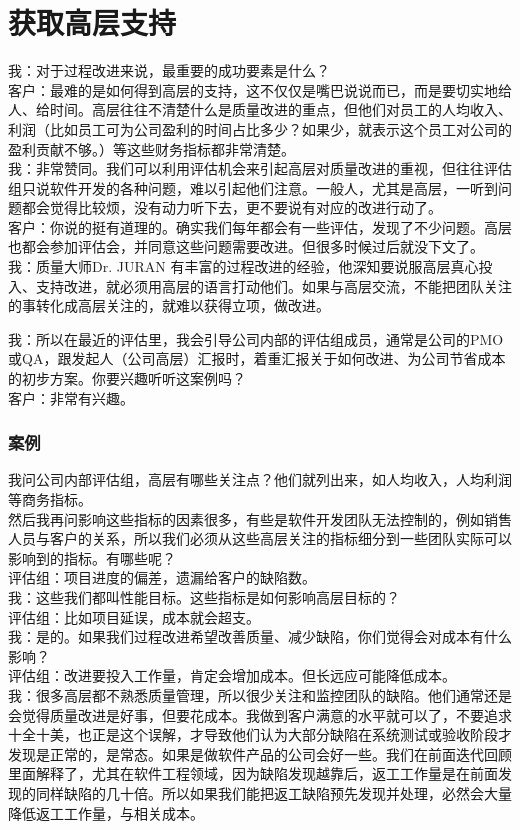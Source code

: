 \chapter{获取高层支持} %

我：对于过程改进来说，最重要的成功要素是什么？\\
客户：最难的是如何得到高层的支持，这不仅仅是嘴巴说说而已，而是要切实地给人、给时间。高层往往不清楚什么是质量改进的重点，但他们对员工的人均收入、利润（比如员工可为公司盈利的时间占比多少？如果少，就表示这个员工对公司的盈利贡献不够。）等这些财务指标都非常清楚。\\
我：非常赞同。我们可以利用评估机会来引起高层对质量改进的重视，但往往评估组只说软件开发的各种问题，难以引起他们注意。一般人，尤其是高层，一听到问题都会觉得比较烦，没有动力听下去，更不要说有对应的改进行动了。\\
客户：你说的挺有道理的。确实我们每年都会有一些评估，发现了不少问题。高层也都会参加评估会，并同意这些问题需要改进。但很多时候过后就没下文了。\\
我：质量大师Dr. JURAN
有丰富的过程改进的经验，他深知要说服高层真心投入、支持改进，就必须用高层的语言打动他们。如果与高层交流，不能把团队关注的事转化成高层关注的，就难以获得立项，做改进。

我：所以在最近的评估里，我会引导公司内部的评估组成员，通常是公司的PMO或QA，跟发起人（公司高层）汇报时，着重汇报关于如何改进、为公司节省成本的初步方案。你要兴趣听听这案例吗？\\
客户：非常有兴趣。\\
\hypertarget{ux7b2cux4e00ux7248ux65b9ux6848ux4e66}{%
\subsection{案例}\label{ux7b2cux4e00ux7248ux65b9ux6848ux4e66}}
我问公司内部评估组，高层有哪些关注点？他们就列出来，如人均收入，人均利润等商务指标。\\
然后我再问影响这些指标的因素很多，有些是软件开发团队无法控制的，例如销售人员与客户的关系，所以我们必须从这些高层关注的指标细分到一些团队实际可以影响到的指标。有哪些呢？\\
评估组：项目进度的偏差，遗漏给客户的缺陷数。\\
我：这些我们都叫性能目标。这些指标是如何影响高层目标的？\\
评估组：比如项目延误，成本就会超支。\\
我：是的。如果我们过程改进希望改善质量、减少缺陷，你们觉得会对成本有什么影响？\\
评估组：改进要投入工作量，肯定会增加成本。但长远应可能降低成本。\\
我：很多高层都不熟悉质量管理，所以很少关注和监控团队的缺陷。他们通常还是会觉得质量改进是好事，但要花成本。我做到客户满意的水平就可以了，不要追求十全十美，也正是这个误解，才导致他们认为大部分缺陷在系统测试或验收阶段才发现是正常的，是常态。如果是做软件产品的公司会好一些。我们在前面迭代回顾里面解释了，尤其在软件工程领域，因为缺陷发现越靠后，返工工作量是在前面发现的同样缺陷的几十倍。所以如果我们能把返工缺陷预先发现并处理，必然会大量降低返工工作量，与相关成本。\\

